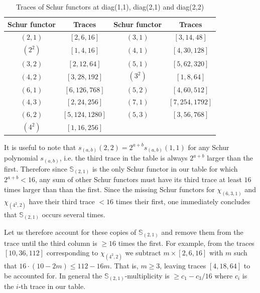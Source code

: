 \documentclass[12pt]{article}
\newcommand{\Specht}[1]{\chi_{#1}}
\newcommand{\Schur}[1]{\mathbb{S}_{#1}}
\theoremstyle{plain}
\theoremstyle{definition}
\theoremstyle{remark}
\begin{document}
\begin{table}[h]
    \centering
    \begin{tabular}{|c|c||c|c|}
\hline
Schur functor & Traces & Schur functor & Traces \\
\hline
$(2,1)$ & $[2, 6, 16]$ & $(3,1)$ & $[3, 14, 48]$ \\ 
\hline
$(2^2)$ & $[1, 4, 16]$ & $(4,1)$ & $[4, 30, 128]$ \\ 
\hline
$(3,2)$ & $[2, 12, 64]$ & $(5,1)$ & $[5, 62, 320]$ \\ 
\hline
$(4,2)$ & $[3, 28, 192]$ & $(3^2)$ & $[1, 8, 64]$ \\ 
\hline
$(6,1)$ & $[6, 126, 768]$ & $(5,2)$ & $[4, 60, 512]$ \\ 
\hline
$(4,3)$ & $[2, 24, 256]$ & $(7,1)$ & $[7, 254, 1792]$ \\ 
\hline
$(6,2)$ & $[5, 124, 1280]$ & $(5,3)$ & $[3, 56, 768]$ \\ 
\hline
$(4^2)$ & $[1, 16, 256]$ & &\\ %
\hline
    \end{tabular}
    \caption{Traces of Schur functors at diag(1,1), diag(2,1) and diag(2,2)}
    \label{table:traces_Schur_rank2}
\end{table}

It is useful to note that $s_{(a,b)}(2,2) = 2^{a+b}s_{(a,b)}(1,1)$ for any Schur polynomial $s_{(a,b)}$, i.e. the third trace in the table is always $2^{a+b}$ larger than the first. Therefore since $\Schur{(2,1)}$ is the only Schur functor in our table for which $2^{a+b} < 16$, any sum of other Schur functors must have its third trace at least $16$ times larger than than the first. Since the missing Schur functors for $\Specht{(6,3,1)}$ and $\Specht{(4^2,2)}$ have their third trace $< 16$ times their first, one immediately concludes that $\Schur{(2,1)}$ occurs several times.

Let us therefore account for these copies of $\Schur{(2,1)}$ and remove them from the trace until the third column is $\geq 16$ times the first. For example, from the traces $[10,36,112]$ corresponding to $\Specht{(4^2,2)}$ we subtract $m \times [2,6,16]$ with $m$ such that $16\cdot(10-2m) \leq 112 - 16m$. That is, $m \geq 3$, leaving traces $[4,18,64]$ to be accounted for. In general the $\Schur{(2,1)}$-multiplicity is $\geq c_1- c_3/16$ where $c_i$ is the $i$-th trace in our table.
\end{document}
